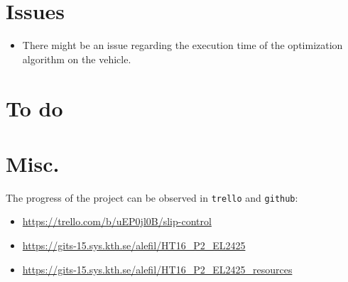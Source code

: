 \documentclass[oneside,12pt]{article}
\begin{document}
\section{Issues}

\begin{itemize}
  \item There might be an issue regarding the execution time of the optimization
    algorithm on the vehicle.
\end{itemize}


\section{To do}


\section{Misc.}

The progress of the project can be observed in \texttt{trello} and \texttt{github}:

\begin{itemize}
  \item \url{https://trello.com/b/uEP0jl0B/slip-control}
  \item \url{https://gits-15.sys.kth.se/alefil/HT16_P2_EL2425}
  \item \url{https://gits-15.sys.kth.se/alefil/HT16_P2_EL2425_resources}
\end{itemize}
\end{document}
